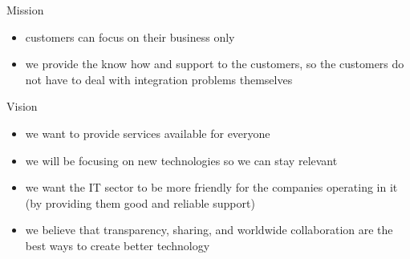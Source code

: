 \documentclass[]{beamer}
\begin{document}
    \begin{frame}{Mission}
      \begin{adjustwidth}{-5mm}{0mm}
        \begin{itemize}
        	\item customers can focus on their business only\\[4mm]
    		\item we provide the know how and support to the customers, so the customers do not have to deal with integration problems themselves
        \end{itemize}
      \end{adjustwidth}
    \end{frame}

    \begin{frame}{Vision}
      \begin{adjustwidth}{-5mm}{0mm}
        \begin{itemize}
          \item we want to provide services available for everyone\\[4mm]
          \item we will be focusing on new technologies so we can stay relevant\\[4mm]
          \item we want the IT sector to be more friendly for the companies operating in it (by providing them good and reliable support)\\[4mm]
          \item we believe that transparency, sharing, and worldwide collaboration are the best ways to create better technology
        \end{itemize}
      \end{adjustwidth}
    \end{frame}
\end{document}
